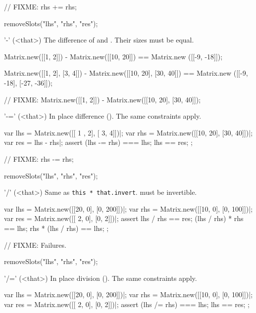 \begin{urbiscriptapi}
\begin{urbiscript}
// FIXME: rhs += rhs;
\end{urbiscript}
\begin{urbicomment}
  removeSlots("lhs", "rhs", "res");
\end{urbicomment}

\item['-'](<that>)%
  The difference of \this and \that.  Their sizes must be equal.
\begin{urbiassert}
Matrix.new([[1, 2]]) - Matrix.new([[10, 20]])
  == Matrix.new ([[-9, -18]]);

Matrix.new([[1, 2], [3, 4]]) - Matrix.new([[10, 20], [30, 40]])
  == Matrix.new ([[-9, -18], [-27, -36]]);

// FIXME: Matrix.new([[1, 2]]) - Matrix.new([[10, 20], [30, 40]]);
\end{urbiassert}


\item['-='](<that>)%
  In place difference ().  The same constraints apply.
\begin{urbiscript}
var lhs = Matrix.new([[ 1 , 2], [ 3,  4]])|;
var rhs = Matrix.new([[10, 20], [30, 40]])|;
var res = lhs - rhs|;
assert
{
  (lhs -= rhs) === lhs;
  lhs == res;
};

// FIXME: rhs -= rhs;
\end{urbiscript}
\begin{urbicomment}
  removeSlots("lhs", "rhs", "res");
\end{urbicomment}

\item['/'](<that>)%
  Same as \lstinline|this * that.invert|.  \that must be invertible.
\begin{urbiscript}
var lhs = Matrix.new([[20, 0], [0, 200]])|;
var rhs = Matrix.new([[10, 0], [0, 100]])|;
var res = Matrix.new([[ 2, 0], [0,   2]])|;
assert
{
  lhs / rhs == res;
  (lhs / rhs) * rhs == lhs;
  rhs * (lhs / rhs) == lhs;
};

// FIXME: Failures.
\end{urbiscript}
\begin{urbicomment}
  removeSlots("lhs", "rhs", "res");
\end{urbicomment}

\item['/='](<that>)%
  In place division ().  The same constraints apply.
\begin{urbiscript}
var lhs = Matrix.new([[20, 0], [0, 200]])|;
var rhs = Matrix.new([[10, 0], [0, 100]])|;
var res = Matrix.new([[ 2, 0], [0,   2]])|;
assert
{
  (lhs /= rhs) === lhs;
  lhs == res;
};


\end{urbiscript}
\end{urbiscriptapi}

